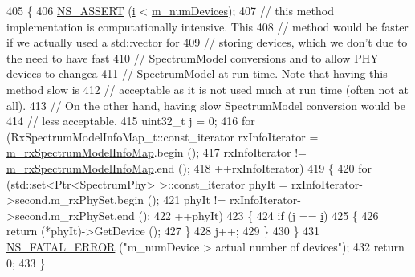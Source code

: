 \begin{DoxyCode}
405 \{
406   \hyperlink{assert_8h_a6dccdb0de9b252f60088ce281c49d052}{NS\_ASSERT} (\hyperlink{bernuolliDistribution_8m_a6f6ccfcf58b31cb6412107d9d5281426}{i} < \hyperlink{classns3_1_1MultiModelSpectrumChannel_a7f0e7254387c3080acb99e0d51f58700}{m\_numDevices});
407   \textcolor{comment}{// this method implementation is computationally intensive. This}
408   \textcolor{comment}{// method would be faster if we actually used a std::vector for}
409   \textcolor{comment}{// storing devices, which we don't due to the need to have fast }
410   \textcolor{comment}{// SpectrumModel conversions and to allow PHY devices to changea}
411   \textcolor{comment}{// SpectrumModel at run time. Note that having this method slow is}
412   \textcolor{comment}{// acceptable as it is not used much at run time (often not at all).}
413   \textcolor{comment}{// On the other hand, having slow SpectrumModel conversion would be}
414   \textcolor{comment}{// less acceptable. }
415   uint32\_t j = 0;
416   \textcolor{keywordflow}{for} (RxSpectrumModelInfoMap\_t::const\_iterator rxInfoIterator = 
      \hyperlink{classns3_1_1MultiModelSpectrumChannel_af75faef47b2e879fd82de7364ac2bcd0}{m\_rxSpectrumModelInfoMap}.begin ();
417        rxInfoIterator !=  \hyperlink{classns3_1_1MultiModelSpectrumChannel_af75faef47b2e879fd82de7364ac2bcd0}{m\_rxSpectrumModelInfoMap}.end ();
418        ++rxInfoIterator)
419     \{
420       \textcolor{keywordflow}{for} (std::set<Ptr<SpectrumPhy> >::const\_iterator phyIt = rxInfoIterator->second.m\_rxPhySet.begin ();
421            phyIt != rxInfoIterator->second.m\_rxPhySet.end ();
422            ++phyIt)        
423         \{
424           \textcolor{keywordflow}{if} (j == \hyperlink{bernuolliDistribution_8m_a6f6ccfcf58b31cb6412107d9d5281426}{i})
425             \{
426               \textcolor{keywordflow}{return} (*phyIt)->GetDevice ();
427             \}
428           j++;
429         \}
430     \}
431   \hyperlink{group__fatal_ga5131d5e3f75d7d4cbfd706ac456fdc85}{NS\_FATAL\_ERROR} (\textcolor{stringliteral}{"m\_numDevice > actual number of devices"});
432   \textcolor{keywordflow}{return} 0;
433 \}
\end{DoxyCode}
